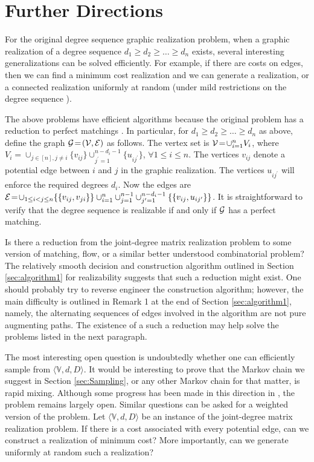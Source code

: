 \documentclass[12pt,a4paper]{article}
\theoremstyle{definition}
\theoremstyle{plain}
\begin{document}
\vspace{-3 ex}\section{Further Directions}
\label{sec:discussion}


For the original 
degree sequence graphic realization problem,
when a graphic realization of a degree sequence 
$d_1 \geq d_2 \geq \ldots \geq d_n$ exists,
several interesting generalizations
can be solved efficiently.
For example, 
if there are costs on edges, then we
can find a minimum cost realization and 
we can generate a realization, or a connected realization 
uniformly at random 
(under mild restrictions on the degree sequence \cite{JS2,ALENEX03,SODAMCMC,FOCS06}).

The above problems have efficient algorithms
because the original problem has a reduction
to perfect matchings \cite{Val79,JS2,Sinclair}.
In particular, for
$d_1 \geq d_2 \geq \ldots \geq d_n$ as above,
define the graph ${\cal G}\! = \! ({\cal V},{\cal E})$
as follows.
The vertex set is ${\cal V} \! = \! \cup_{i=1}^n V_i$,
where $V_i \! = \! \cup_{j\in [n], j\neq i} \{ v_{ij} \}
                   \cup_{j^{\prime}=1}^{n-d_i-1} \{ u_{ij^{\prime}} \}$,
              $\forall 1 \leq i \leq n$.
The vertices $v_{ij}$ denote a potential
edge between $i$ and $j$ in the graphic realization.
The vertices $u_{ij^{\prime}}$ will enforce the required degrees $d_i$.
Now the edges are
${\cal E} \! = \! \cup_{1 \leq i < j \leq n} \{ \{ v_{ij},v_{ji} \} \}
\cup_{i=1}^n \cup_{j=1}^{n-1}
        \cup_{j^{\prime}=1}^{n-d_i-1} \{ \{ v_{ij} , u_{ij^{\prime}} \} \}$.
It is straightforward to verify that
the degree sequence is realizable
if and only if  ${\cal G}$
has a perfect matching.

Is there a reduction from the
joint-degree matrix realization problem to some
version of matching, flow, or a similar
better understood combinatorial problem?
The relatively smooth decision and construction
algorithm outlined in Section \ref{sec:algorithm1} for realizability
suggests that such a reduction might exist.
One should probably try to reverse engineer the construction algorithm;
however, the main difficulty is outlined in Remark 1 at the end of 
Section \ref{sec:algorithm1},
namely, the alternating sequences of edges involved in the
algorithm are not pure augmenting paths. The existence of a
such a reduction may help solve the problems listed in the next paragraph.

The most interesting open question is undoubtedly whether one can efficiently sample from $\langle{\mathbb V},d,D\rangle$. It would be interesting to 
prove that the Markov chain we suggest in Section \ref{sec:Sampling}, or any other
Markov chain for that matter, is rapid mixing. Although some progress has been made in this direction in \cite{EMT15}, the problem remains largely open. Similar questions can be asked for a weighted version of the problem.
Let $\langle{\mathbb V},d,D\rangle$ be an instance of the joint-degree matrix
realization problem.
If there is a cost associated with every potential edge,
can we construct a realization of minimum cost?
More importantly, can we generate uniformly at random such a realization? 
\end{document}
